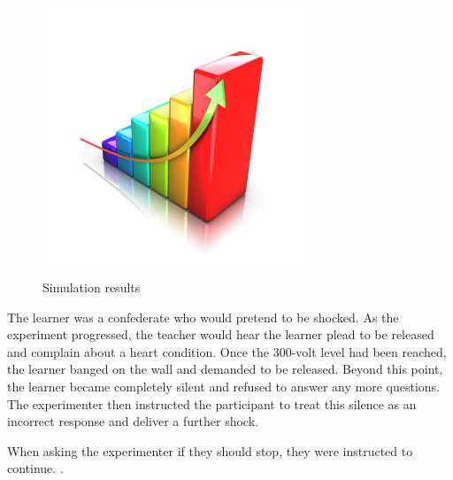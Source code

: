 \documentclass[conference]{IEEEtran}
\begin{document}
\begin{figure}[!ht] 
\begin{center}
\includegraphics[width=8cm]{graph1.jpg}
\caption{Simulation results}
\label{grafik1}
\end{center}
\end{figure}

The learner was a confederate who would pretend to be shocked. As the experiment progressed, 
the teacher would hear the learner plead to be released and complain about a heart condition. 
Once the 300-volt level had been reached, the learner banged on the wall and demanded to be 
released. Beyond this point, the learner became completely silent and refused to answer any 
more questions. The experimenter then instructed the participant to treat this silence as an 
incorrect response and deliver a further shock. \cite{francis1993volcanoes}

When asking the experimenter if they should stop, they were instructed to continue. \cite{milgram1978obedience}.
\end{document}
